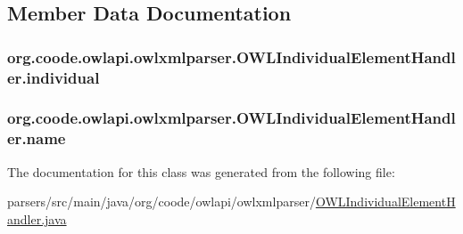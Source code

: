 \subsection{Member Data Documentation}
\hypertarget{classorg_1_1coode_1_1owlapi_1_1owlxmlparser_1_1_o_w_l_individual_element_handler_a899a77e365f5bb99936c0da910c8be38}{
\subsubsection[{individual}]{ org.\-coode.\-owlapi.\-owlxmlparser.\-O\-W\-L\-Individual\-Element\-Handler.\-individual\hspace{0.3cm}{\ttfamily [private]}}}\label{classorg_1_1coode_1_1owlapi_1_1owlxmlparser_1_1_o_w_l_individual_element_handler_a899a77e365f5bb99936c0da910c8be38}
\hypertarget{classorg_1_1coode_1_1owlapi_1_1owlxmlparser_1_1_o_w_l_individual_element_handler_a6476815a69d128bcaf28834544d2ebbe}{
\subsubsection[{name}]{ org.\-coode.\-owlapi.\-owlxmlparser.\-O\-W\-L\-Individual\-Element\-Handler.\-name\hspace{0.3cm}{\ttfamily [private]}}}\label{classorg_1_1coode_1_1owlapi_1_1owlxmlparser_1_1_o_w_l_individual_element_handler_a6476815a69d128bcaf28834544d2ebbe}


The documentation for this class was generated from the following file\-:\begin{DoxyCompactItemize}
\item 
parsers/src/main/java/org/coode/owlapi/owlxmlparser/\hyperlink{_o_w_l_individual_element_handler_8java}{O\-W\-L\-Individual\-Element\-Handler.\-java}\end{DoxyCompactItemize}
